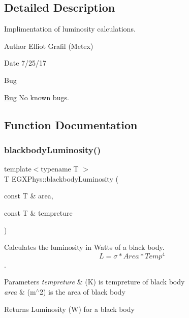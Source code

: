 \subsection{Detailed Description}
Implimentation of luminosity calculations. 

\begin{DoxyAuthor}{Author}
Elliot Grafil (Metex) 
\end{DoxyAuthor}
\begin{DoxyDate}{Date}
7/25/17 
\end{DoxyDate}
\begin{DoxyRefDesc}{Bug}
\item[\hyperlink{bug__bug000004}{Bug}]No known bugs. \end{DoxyRefDesc}


\subsection{Function Documentation}
\mbox{\label{_luminosity_8hpp_file_a909f82edfaed449b44e94788b642ebb8}} 
\subsubsection{\texorpdfstring{blackbody\+Luminosity()}{blackbodyLuminosity()}}
{\footnotesize\ttfamily template$<$typename T $>$ \\
T E\+G\+X\+Phys\+::blackbody\+Luminosity (\begin{DoxyParamCaption}\item[{const T \&}]{area,  }\item[{const T \&}]{tempreture }\end{DoxyParamCaption})}



Calculates the luminosity in Watts of a black body. \[L=\sigma*Area*Temp^4\]. 


\begin{DoxyParams}{Parameters}
{\em tempreture} & (K) is tempreture of black body \\
\hline
{\em area} & (m$^\wedge$2) is the area of black body \\
\hline
\end{DoxyParams}
\begin{DoxyReturn}{Returns}
Luminosity (W) for a black body 
\end{DoxyReturn}
\mbox{\label{_luminosity_8hpp_file_a6d6865b2aac1bc7c7f06b7c4ac2444e4}} 
